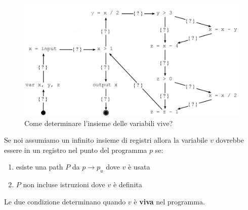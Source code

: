 \begin{figure}[H]
  \centering
  \includegraphics[scale=0.4]{res/image/cfg_liveness}
  \caption{Come determinare l'insieme delle variabili vive?}
  \label{img:cfg_liveness}
\end{figure}

\begin{definition}
Se noi assumiamo un infinito insieme di registri allora la variabile $v$
dovrebbe essere in un registro nel punto del programma $p$ se:
\begin{enumerate}
\item esiste una path $P$ da $p \to p_u$ dove $v$ \`e usata
\item $P$ non incluse istruzioni dove $v$ \`e definita
\end{enumerate}

Le due condizione determinano quando $v$ \`e \textbf{viva} nel programma.
\end{definition}


